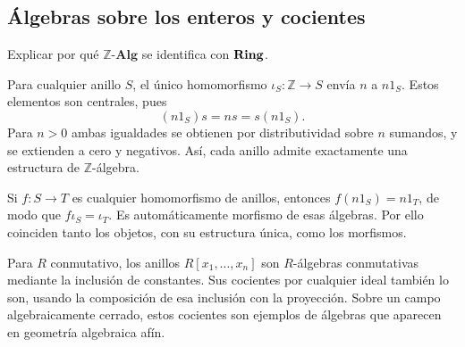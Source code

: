 \subsection{Álgebras sobre los enteros y cocientes}\label{tema:13-3-1f}
\begin{ejer}\label{ejer:C13-Zalg}
Explicar por qué $\mathbb Z\text{-}\mathbf{Alg}$ se identifica con $\mathbf{Ring}$.
\end{ejer}
\begin{sol}
Para cualquier anillo $S$, el único homomorfismo $\iota_S:\mathbb Z\to S$ envía $n$ a $n1_S$. Estos elementos son centrales, pues
\[
(n1_S)s=ns=s(n1_S).
\]
Para $n>0$ ambas igualdades se obtienen por distributividad sobre $n$ sumandos, y se extienden a cero y negativos. Así, cada anillo admite exactamente una estructura de $\mathbb Z$-álgebra.

Si $f:S\to T$ es cualquier homomorfismo de anillos, entonces $f(n1_S)=n1_T$, de modo que $f\iota_S=\iota_T$. Es automáticamente morfismo de esas álgebras. Por ello coinciden tanto los objetos, con su estructura única, como los morfismos.
\end{sol}

Para $R$ conmutativo, los anillos $R[x_1,\ldots,x_n]$ son $R$-álgebras conmutativas mediante la inclusión de constantes. Sus cocientes por cualquier ideal también lo son, usando la composición de esa inclusión con la proyección. Sobre un campo algebraicamente cerrado, estos cocientes son ejemplos de álgebras que aparecen en geometría algebraica afín.
